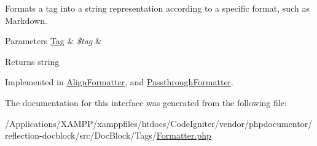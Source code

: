 Formats a tag into a string representation according to a specific format, such as Markdown.


\begin{DoxyParams}[1]{Parameters}
\mbox{\hyperlink{interfacephp_documentor_1_1_reflection_1_1_doc_block_1_1_tag}{Tag}} & {\em \$tag} & \\
\hline
\end{DoxyParams}
\begin{DoxyReturn}{Returns}
string 
\end{DoxyReturn}


Implemented in \mbox{\hyperlink{classphp_documentor_1_1_reflection_1_1_doc_block_1_1_tags_1_1_formatter_1_1_align_formatter_a237fc645f9f13d476abbb368c53b64d0}{Align\+Formatter}}, and \mbox{\hyperlink{classphp_documentor_1_1_reflection_1_1_doc_block_1_1_tags_1_1_formatter_1_1_passthrough_formatter_a237fc645f9f13d476abbb368c53b64d0}{Passthrough\+Formatter}}.



The documentation for this interface was generated from the following file\+:\begin{DoxyCompactItemize}
\item 
/\+Applications/\+X\+A\+M\+P\+P/xamppfiles/htdocs/\+Code\+Igniter/vendor/phpdocumentor/reflection-\/docblock/src/\+Doc\+Block/\+Tags/\mbox{\hyperlink{_formatter_8php}{Formatter.\+php}}\end{DoxyCompactItemize}
